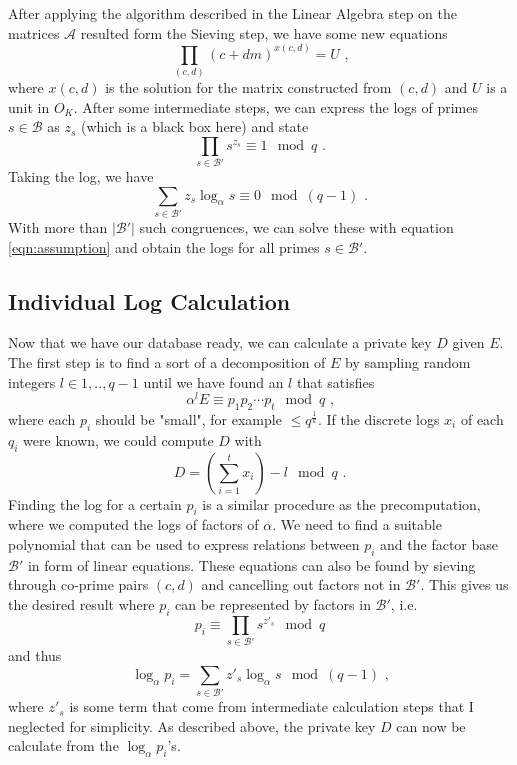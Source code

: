 \documentclass[paper=a4, fontsize=11pt]{scrartcl} %
\numberwithin{equation}{section} %
\numberwithin{figure}{section} %
\numberwithin{table}{section} %
\begin{document}
After applying the algorithm described in the Linear Algebra step on the matrices $\mathcal{A}$ resulted form the Sieving step, we have some new equations
\begin{equation}
\prod_{(c,d)}(c+dm)^{x(c,d)} = U
\textit{ ,}
\end{equation}
where $x(c,d)$ is the solution for the matrix constructed from $(c,d)$ and $U$ is a unit in $O_K$. After some intermediate steps, we can express the logs of primes $s\in\mathcal{B}$ as $z_s$ (which is a black box here) and state
\begin{equation}
\prod_{s\in\mathcal{B}'}s^{z_s}\equiv 1\mod q
\text{ .}
\end{equation}
Taking the log, we have
\begin{equation}
\sum_{s\in\mathcal{B}'}z_s\log_\alpha s \equiv 0 \mod (q-1)
\text{ .}
\end{equation}
With more than $|\mathcal{B}'|$ such congruences, we can solve these with equation \ref{eqn:assumption} and obtain the logs for all primes $s\in\mathcal{B}'$.

\subsection{Individual Log Calculation}
\label{subsec:indiviualLogCalculation}
Now that we have our database ready, we can calculate a private key $D$ given $E$. The first step is to find a sort of a decomposition of $E$ by sampling random integers $l\in{1,..,q-1}$ until we have found an $l$ that satisfies
\begin{equation}
\alpha^lE\equiv p_1p_2\cdots p_t\mod q
\text{ ,}
\end{equation}
where each $p_i$ should be "small", for example $\leq q^\frac{1}{k}$. If the discrete logs $x_i$ of each $q_i$ were known, we could compute $D$ with
\begin{equation}
D = \left(\sum_{i=1}^{t}x_i\right)-l \mod q
\text{ .}
\end{equation}
Finding the log for a certain $p_i$ is a similar procedure as the precomputation, where we computed the logs of factors of $\alpha$. We need to find a suitable polynomial that can be used to express relations between $p_i$ and the factor base $\mathcal{B}'$ in form of linear equations. These equations can also be found by sieving through co-prime pairs $(c,d)$ and cancelling out factors not in $\mathcal{B}'$. This gives us the desired result where $p_i$ can be represented by factors in $\mathcal{B}'$, i.e.
\begin{equation}
p_i \equiv \prod_{s\in\mathcal{B}'}s^{z'_s} \mod q
\end{equation}
and thus
\begin{equation}
\log_{\alpha}p_i = \sum_{s\in\mathcal{B}'}z'_s\log_{\alpha}s \mod (q-1)
\text{ ,}
\end{equation}
where $z'_s$ is some term that come from intermediate calculation steps that I neglected for simplicity. As described above, the private key $D$ can now be calculate from the $\log_{\alpha}p_i$'s.
\end{document}

